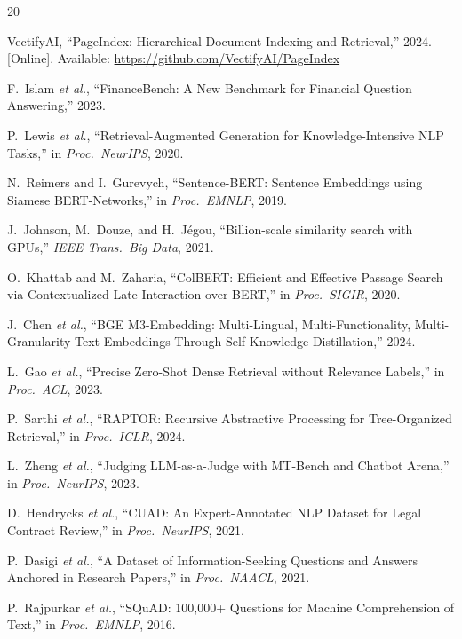\documentclass[journal]{IEEEtran}
\begin{document}
\begin{thebibliography}{20}

VectifyAI, ``PageIndex: Hierarchical Document Indexing and Retrieval,'' 2024. [Online]. Available: \url{https://github.com/VectifyAI/PageIndex}

F.~Islam \emph{et al.}, ``FinanceBench: A New Benchmark for Financial Question Answering,'' 2023.

P.~Lewis \emph{et al.}, ``Retrieval-Augmented Generation for Knowledge-Intensive NLP Tasks,'' in \emph{Proc.\ NeurIPS}, 2020.

N.~Reimers and I.~Gurevych, ``Sentence-BERT: Sentence Embeddings using Siamese BERT-Networks,'' in \emph{Proc.\ EMNLP}, 2019.

J.~Johnson, M.~Douze, and H.~J{\'e}gou, ``Billion-scale similarity search with GPUs,'' \emph{IEEE Trans.\ Big Data}, 2021.

O.~Khattab and M.~Zaharia, ``ColBERT: Efficient and Effective Passage Search via Contextualized Late Interaction over BERT,'' in \emph{Proc.\ SIGIR}, 2020.

J.~Chen \emph{et al.}, ``BGE M3-Embedding: Multi-Lingual, Multi-Functionality, Multi-Granularity Text Embeddings Through Self-Knowledge Distillation,'' 2024.

L.~Gao \emph{et al.}, ``Precise Zero-Shot Dense Retrieval without Relevance Labels,'' in \emph{Proc.\ ACL}, 2023.

P.~Sarthi \emph{et al.}, ``RAPTOR: Recursive Abstractive Processing for Tree-Organized Retrieval,'' in \emph{Proc.\ ICLR}, 2024.

L.~Zheng \emph{et al.}, ``Judging LLM-as-a-Judge with MT-Bench and Chatbot Arena,'' in \emph{Proc.\ NeurIPS}, 2023.

D.~Hendrycks \emph{et al.}, ``CUAD: An Expert-Annotated NLP Dataset for Legal Contract Review,'' in \emph{Proc.\ NeurIPS}, 2021.

P.~Dasigi \emph{et al.}, ``A Dataset of Information-Seeking Questions and Answers Anchored in Research Papers,'' in \emph{Proc.\ NAACL}, 2021.

P.~Rajpurkar \emph{et al.}, ``SQuAD: 100,000+ Questions for Machine Comprehension of Text,'' in \emph{Proc.\ EMNLP}, 2016.

\end{thebibliography}
\end{document}
